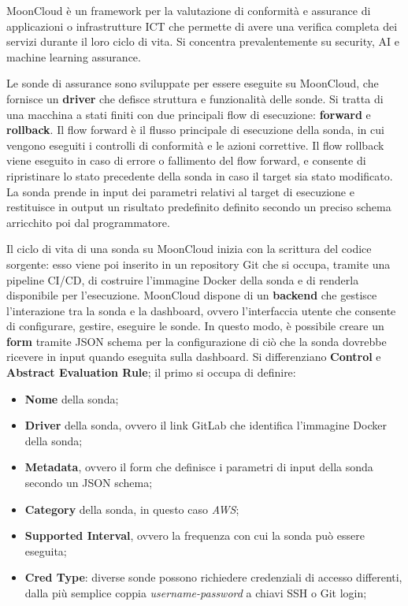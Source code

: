 MoonCloud \cite{8647247} è un framework per la valutazione di conformità e assurance di applicazioni o infrastrutture ICT che permette di avere una verifica completa dei servizi durante il loro ciclo di vita. Si concentra prevalentemente su security, AI e machine learning assurance.

Le sonde di assurance sono sviluppate per essere eseguite su MoonCloud, che fornisce un \textbf{driver} che defisce struttura e funzionalità delle sonde. Si tratta di una macchina a stati finiti con due principali flow di esecuzione: \textbf{forward} e \textbf{rollback}. Il flow forward è il flusso principale di esecuzione della sonda, in cui vengono eseguiti i controlli di conformità e le azioni correttive. Il flow rollback viene eseguito in caso di errore o fallimento del flow forward, e consente di ripristinare lo stato precedente della sonda in caso il target sia stato modificato. La sonda prende in input dei parametri relativi al target di esecuzione e restituisce in output un risultato predefinito definito secondo un preciso schema arricchito poi dal programmatore.

Il ciclo di vita di una sonda su MoonCloud inizia con la scrittura del codice sorgente: esso viene poi inserito in un repository Git che si occupa, tramite una pipeline CI/CD, di costruire l'immagine Docker della sonda e di renderla disponibile per l'esecuzione. MoonCloud dispone di un \textbf{backend} che gestisce l'interazione tra la sonda e la dashboard, ovvero l'interfaccia utente che consente di configurare, gestire, eseguire le sonde. In questo modo, è possibile creare un \textbf{form} tramite JSON schema per la configurazione di ciò che la sonda dovrebbe ricevere in input quando eseguita sulla dashboard. Si differenziano \textbf{Control} e \textbf{Abstract Evaluation Rule};
il primo si occupa di definire:

\begin{itemize}
    \item \textbf{Nome} della sonda;
    \item \textbf{Driver} della sonda, ovvero il link GitLab che identifica l'immagine Docker della sonda;
    \item \textbf{Metadata}, ovvero il form che definisce i parametri di input della sonda secondo un JSON schema;
    \item \textbf{Category} della sonda, in questo caso \textit{AWS};
    \item \textbf{Supported Interval}, ovvero la frequenza con cui la sonda può essere eseguita;
    \item \textbf{Cred Type}: diverse sonde possono richiedere credenziali di accesso differenti, dalla più semplice coppia \textit{username-password} a chiavi SSH o Git login;
\end{itemize}

